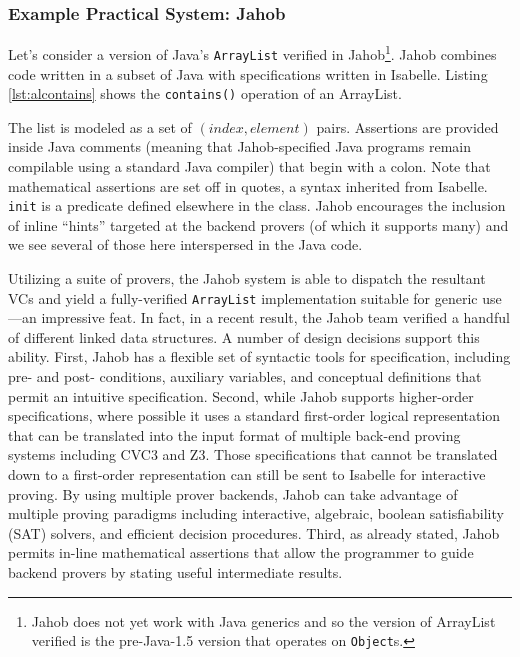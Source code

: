 \subsubsection{Example Practical System: Jahob\label{sec:exPractical}}
Let's consider a version of Java's \texttt{ArrayList} verified in Jahob\footnote{Jahob does not yet work with Java generics and so the version of ArrayList verified is the pre-Java-1.5 version that operates on \texttt{Object}s.}.  Jahob combines code written in a subset of Java with specifications written in Isabelle.  Listing \ref{lst:alcontains} shows the \texttt{contains()} operation of an ArrayList.



The list is modeled as a set of $(index, element)$ pairs.  Assertions are provided inside Java comments (meaning that Jahob-specified Java programs remain compilable using a standard Java compiler) that begin with a colon.  Note that mathematical assertions are set off in quotes, a syntax inherited from Isabelle.  \texttt{init} is a predicate defined elsewhere in the class.  Jahob encourages the inclusion of inline ``hints'' targeted at the backend provers\cite{zeeIntegratedProofLanguage} (of which it supports many) and we see several of those here interspersed in the Java code.

Utilizing a suite of provers, the Jahob system is able to dispatch the resultant VCs and yield a fully-verified \texttt{ArrayList} implementation suitable for generic use---an impressive feat.  In fact, in a recent result, the Jahob team verified a handful of different linked data structures\cite{zee:annotations}.  A number of design decisions support this ability.  First, Jahob has a flexible set of syntactic tools for specification, including pre- and post- conditions, auxiliary variables\cite{kingVerifier}, and conceptual definitions that permit an intuitive specification.  Second, while Jahob supports higher-order specifications, where possible it uses a standard first-order logical representation that can be translated into the input format of multiple back-end proving systems including CVC3\cite{barretCVC3} and Z3\cite{deMouraZ3}.  Those specifications that cannot be translated down to a first-order representation can still be sent to Isabelle for interactive proving.  By using multiple prover backends, Jahob can take advantage of multiple proving paradigms including interactive, algebraic, boolean satisfiability (SAT) solvers, and efficient decision procedures.  Third, as already stated, Jahob permits in-line mathematical assertions that allow the programmer to guide backend provers by stating useful intermediate results.

